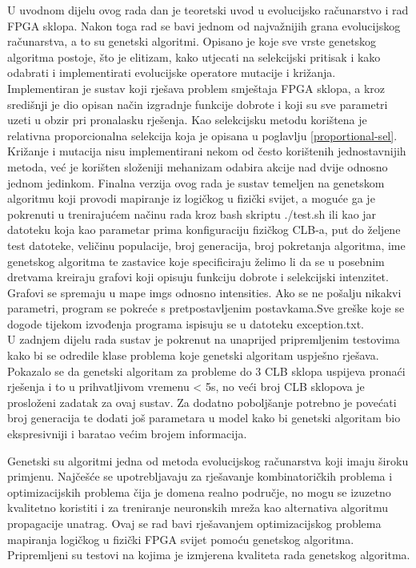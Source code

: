 \documentclass[times, utf8, zavrsni]{fer}
\begin{document}
		U uvodnom dijelu ovog rada dan je teoretski uvod u evolucijsko računarstvo i rad FPGA sklopa. Nakon toga rad se bavi jednom od najvažnijih grana evolucijskog računarstva, a to su genetski algoritmi. Opisano je koje sve vrste genetskog algoritma postoje, što je elitizam, kako utjecati na selekcijski pritisak i kako odabrati i implementirati evolucijske operatore mutacije i križanja. \\
		Implementiran je sustav koji rješava problem smještaja FPGA sklopa, a kroz središnji je dio opisan način izgradnje funkcije dobrote i koji su sve parametri uzeti u obzir pri pronalasku rješenja. Kao selekcijsku metodu korištena je relativna proporcionalna selekcija koja je opisana u poglavlju \ref{proportional-sel}. Križanje i mutacija nisu implementirani nekom od često korištenih jednostavnijih metoda, već je korišten složeniji mehanizam odabira akcije nad dvije odnosno jednom jedinkom. Finalna verzija ovog rada je sustav temeljen na genetskom algoritmu koji provodi mapiranje iz logičkog u fizički svijet, a moguće ga je pokrenuti u trenirajućem načinu rada kroz bash skriptu ./test.sh ili kao jar datoteku koja kao parametar prima konfiguraciju fizičkog CLB-a, put do željene test datoteke, veličinu populacije, broj generacija, broj pokretanja algoritma, ime genetskog algoritma te zastavice koje specificiraju želimo li da se u posebnim dretvama kreiraju grafovi koji opisuju funkciju dobrote i selekcijski intenzitet. Grafovi se spremaju u mape imgs odnosno intensities. Ako se ne pošalju nikakvi parametri, program se pokreće s pretpostavljenim postavkama.Sve greške koje se dogode tijekom izvođenja programa ispisuju se u datoteku exception.txt. \\
		U zadnjem dijelu rada sustav je pokrenut na unaprijed pripremljenim testovima kako bi se odredile klase problema koje genetski algoritam uspješno rješava. Pokazalo se da genetski algoritam za probleme do 3 CLB sklopa uspijeva pronaći rješenja i to u prihvatljivom vremenu < 5s, no veći broj CLB sklopova je prosloženi zadatak za ovaj sustav. Za dodatno poboljšanje potrebno je povećati broj generacija te dodati još parametara u model kako bi genetski algoritam bio ekspresivniji i baratao većim brojem informacija.
		
		
		
		
		
		\begin{sazetak}
			
			Genetski su algoritmi jedna od metoda evolucijskog računarstva koji imaju široku primjenu. Najčešće se upotrebljavaju za rješavanje kombinatoričkih problema i optimizacijskih problema čija je domena realno područje, no mogu se izuzetno kvalitetno koristiti i za treniranje neuronskih mreža kao alternativa algoritmu propagacije unatrag. Ovaj se rad bavi rješavanjem optimizacijskog problema mapiranja logičkog u fizički FPGA svijet pomoću genetskog algoritma. Pripremljeni su testovi na kojima je izmjerena kvaliteta rada genetskog algoritma. 
			
		\end{sazetak}
		
\end{document}

